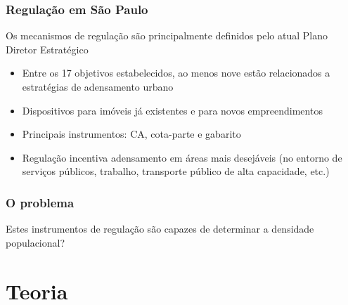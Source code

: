 \documentclass[%
    9pt, 
    aspectratio=169,
]{beamer}
\begin{document}
\begin{frame}
    \frametitle{Regulação em São Paulo}

    Os mecanismos de regulação são principalmente definidos pelo atual Plano Diretor Estratégico \cite[PDE]{PDE}

    \begin{itemize}
        \item Entre os 17 objetivos estabelecidos, ao menos nove estão relacionados a estratégias de adensamento urbano \cite{lima2021alem}
        \item Dispositivos para imóveis já existentes e para novos empreendimentos
        \item Principais instrumentos: CA, cota-parte e gabarito
        \item Regulação incentiva adensamento em áreas mais desejáveis (no entorno de serviços públicos, trabalho, transporte público de alta capacidade, etc.)
    \end{itemize}
\end{frame}

\begin{frame}
    \frametitle{O problema}
    \centering

    Estes instrumentos de regulação são capazes de determinar a densidade populacional?

\end{frame}

\section{Teoria}
\end{document}
